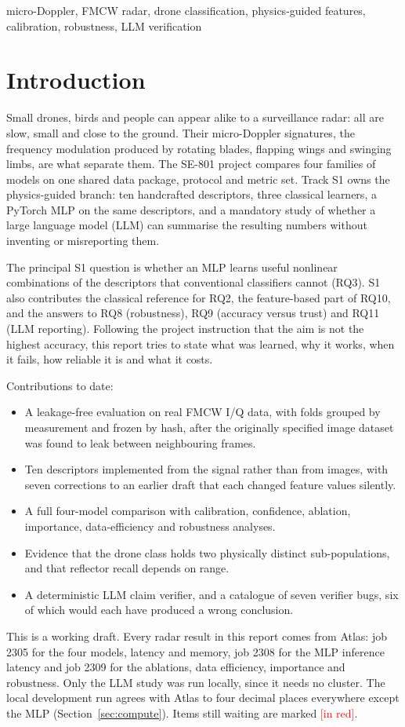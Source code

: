 \documentclass[conference]{IEEEtran}
\newcommand{\pending}[1]{\textcolor{red}{[#1]}}
\begin{document}
\begin{IEEEkeywords}
micro-Doppler, FMCW radar, drone classification, physics-guided features, calibration, robustness, LLM verification
\end{IEEEkeywords}

\section{Introduction}
Small drones, birds and people can appear alike to a surveillance radar: all are slow, small and close to the ground. Their micro-Doppler signatures, the frequency modulation produced by rotating blades, flapping wings and swinging limbs, are what separate them. The SE-801 project compares four families of models on one shared data package, protocol and metric set. Track S1 owns the physics-guided branch: ten handcrafted descriptors, three classical learners, a PyTorch MLP on the same descriptors, and a mandatory study of whether a large language model (LLM) can summarise the resulting numbers without inventing or misreporting them.

The principal S1 question is whether an MLP learns useful nonlinear combinations of the descriptors that conventional classifiers cannot (RQ3). S1 also contributes the classical reference for RQ2, the feature-based part of RQ10, and the answers to RQ8 (robustness), RQ9 (accuracy versus trust) and RQ11 (LLM reporting). Following the project instruction that the aim is not the highest accuracy, this report tries to state what was learned, why it works, when it fails, how reliable it is and what it costs.

Contributions to date:
\begin{itemize}
\item A leakage-free evaluation on real FMCW I/Q data, with folds grouped by measurement and frozen by hash, after the originally specified image dataset was found to leak between neighbouring frames.
\item Ten descriptors implemented from the signal rather than from images, with seven corrections to an earlier draft that each changed feature values silently.
\item A full four-model comparison with calibration, confidence, ablation, importance, data-efficiency and robustness analyses.
\item Evidence that the drone class holds two physically distinct sub-populations, and that reflector recall depends on range.
\item A deterministic LLM claim verifier, and a catalogue of seven verifier bugs, six of which would each have produced a wrong conclusion.
\end{itemize}
This is a working draft. Every radar result in this report comes from Atlas: job 2305 for the four models, latency and memory, job 2308 for the MLP inference latency and job 2309 for the ablations, data efficiency, importance and robustness. Only the LLM study was run locally, since it needs no cluster. The local development run agrees with Atlas to four decimal places everywhere except the MLP (Section~\ref{sec:compute}). Items still waiting are marked \pending{in red}.
\end{document}
